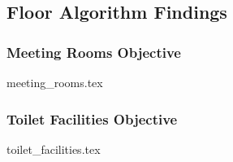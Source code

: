 \subsection{Floor Algorithm Findings}

\subsubsection{Meeting Rooms Objective}
{meeting_rooms.tex}

\subsubsection{Toilet Facilities Objective}
{toilet_facilities.tex}